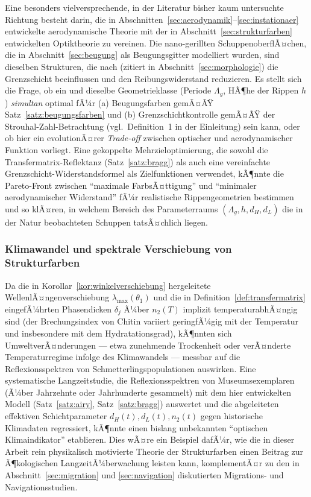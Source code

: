 ﻿\documentclass[a4paper,12pt]{article}
\theoremstyle{definition}
\begin{document}
	Eine besonders vielversprechende, in der Literatur bisher kaum
	untersuchte Richtung besteht darin, die in
	Abschnitten~\ref{sec:aerodynamik}--\ref{sec:instationaer} entwickelte
	aerodynamische Theorie mit der in Abschnitt~\ref{sec:strukturfarben}
	entwickelten Optiktheorie zu vereinen. Die nano-gerillten
	SchuppenoberflÃ¤chen, die in Abschnitt~\ref{sec:beugung} als
	Beugungsgitter modelliert wurden, sind dieselben Strukturen, die nach
	\cite{chen2018butterfly} (zitiert in
	Abschnitt~\ref{sec:morphologie}) die Grenzschicht beeinflussen und
	den Reibungswiderstand reduzieren. Es stellt sich die Frage, ob ein
	und dieselbe Geometrieklasse (Periode $\Lambda_g$, HÃ¶he der Rippen
	$h$) \emph{simultan} optimal fÃ¼r (a) Beugungsfarben gemÃ¤ÃŸ
	Satz~\ref{satz:beugungsfarben} und (b) Grenzschichtkontrolle gemÃ¤ÃŸ
	der Strouhal-Zahl-Betrachtung (vgl.\ Definition~1 in der Einleitung)
	sein kann, oder ob hier ein
	evolutionÃ¤rer \emph{Trade-off} zwischen optischer und
	aerodynamischer Funktion vorliegt. Eine gekoppelte
	Mehrzieloptimierung, die sowohl die Transfermatrix-Reflektanz
	(Satz~\ref{satz:bragg}) als auch eine vereinfachte
	Grenzschicht-Widerstandsformel als Zielfunktionen verwendet, kÃ¶nnte
	die Pareto-Front zwischen ``maximale FarbsÃ¤ttigung'' und ``minimaler
	aerodynamischer Widerstand'' fÃ¼r realistische Rippengeometrien
	bestimmen und so klÃ¤ren, in welchem Bereich des
	Parameterraums $(\Lambda_g, h, d_H, d_L)$ die in der Natur
	beobachteten Schuppen tatsÃ¤chlich liegen.

	\subsubsection{Klimawandel und spektrale Verschiebung von Strukturfarben}

	Da die in Korollar~\ref{kor:winkelverschiebung} hergeleitete
	WellenlÃ¤ngenverschiebung $\lambda_{\max}(\theta_1)$ und die in
	Definition~\ref{def:transfermatrix} eingefÃ¼hrten Phasendicken
	$\delta_j$ Ã¼ber $n_2(T)$ implizit temperaturabhÃ¤ngig sind (der
	Brechungsindex von Chitin variiert geringfÃ¼gig mit der Temperatur und
	insbesondere mit dem Hydratationsgrad), kÃ¶nnten sich
	UmweltverÃ¤nderungen --- etwa zunehmende Trockenheit oder verÃ¤nderte
	Temperaturregime infolge des Klimawandels --- messbar auf die
	Reflexionsspektren von Schmetterlingspopulationen auswirken. Eine
	systematische Langzeitstudie, die Reflexionsspektren von
	Museumsexemplaren (Ã¼ber Jahrzehnte oder Jahrhunderte gesammelt) mit
	dem hier entwickelten Modell (Satz~\ref{satz:airy},
	Satz~\ref{satz:bragg}) auswertet und die abgeleiteten effektiven
	Schichtparameter $d_H(t), d_L(t), n_2(t)$ gegen historische
	Klimadaten regressiert, kÃ¶nnte einen bislang unbekannten
	``optischen Klimaindikator'' etablieren. Dies wÃ¤re ein Beispiel dafÃ¼r,
	wie die in dieser Arbeit rein physikalisch motivierte Theorie der
	Strukturfarben einen Beitrag zur Ã¶kologischen LangzeitÃ¼berwachung
	leisten kann, komplementÃ¤r zu den in
	Abschnitt~\ref{sec:migration} und \ref{sec:navigation} diskutierten
	Migrations- und Navigationsstudien.
\end{document}
